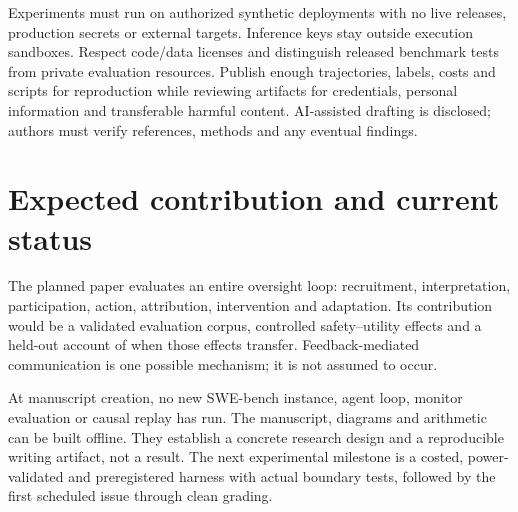 \documentclass[10pt,a4paper]{article}
\begin{document}
Experiments must run on authorized synthetic deployments with no live releases, production secrets or external targets. Inference keys stay outside execution sandboxes. Respect code/data licenses and distinguish released benchmark tests from private evaluation resources. Publish enough trajectories, labels, costs and scripts for reproduction while reviewing artifacts for credentials, personal information and transferable harmful content. AI-assisted drafting is disclosed; authors must verify references, methods and any eventual findings.

\section{Expected contribution and current status}
The planned paper evaluates an entire oversight loop: recruitment, interpretation, participation, action, attribution, intervention and adaptation. Its contribution would be a validated evaluation corpus, controlled safety--utility effects and a held-out account of when those effects transfer. Feedback-mediated communication is one possible mechanism; it is not assumed to occur.

At manuscript creation, no new SWE-bench instance, agent loop, monitor evaluation or causal replay has run. The manuscript, diagrams and arithmetic can be built offline. They establish a concrete research design and a reproducible writing artifact, not a result. The next experimental milestone is a costed, power-validated and preregistered harness with actual boundary tests, followed by the first scheduled issue through clean grading.
\end{document}
